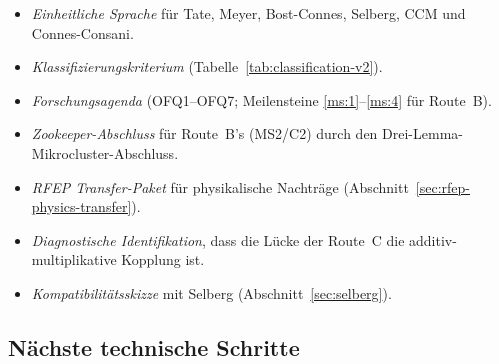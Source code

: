 \documentclass[11pt,a4paper]{article}
\theoremstyle{plain}
\theoremstyle{definition}
\begin{document}
\begin{itemize}
\item \emph{Einheitliche Sprache} für Tate, Meyer, Bost-Connes, Selberg, CCM und Connes-Consani.
\item \emph{Klassifizierungskriterium} (Tabelle~\ref{tab:classification-v2}).
\item \emph{Forschungsagenda} (OFQ1--OFQ7; Meilensteine \ref{ms:1}--\ref{ms:4} für Route~B).
\item \emph{Zookeeper-Abschluss} für Route~B's (MS2/C2) durch den Drei-Lemma-Mikrocluster-Abschluss.
\item \emph{RFEP Transfer-Paket} für physikalische Nachträge (Abschnitt~\ref{sec:rfep-physics-transfer}).
\item \emph{Diagnostische Identifikation}, dass die Lücke der Route~C die additiv-multiplikative Kopplung ist.
\item \emph{Kompatibilitätsskizze} mit Selberg (Abschnitt~\ref{sec:selberg}).
\end{itemize}

\subsection{Nächste technische Schritte}
\end{document}
